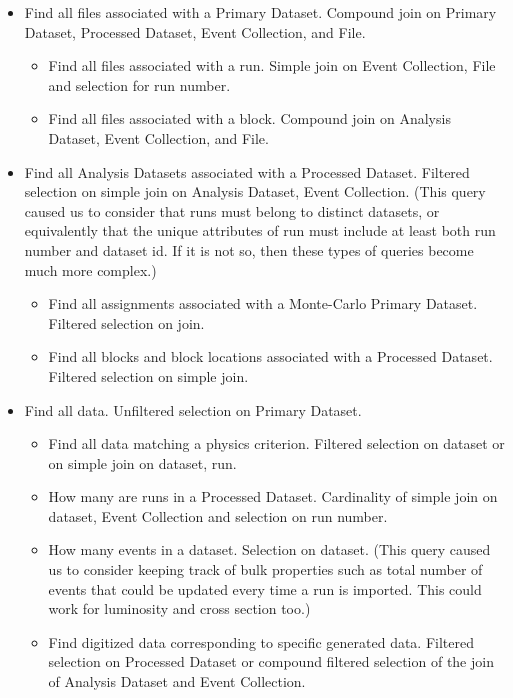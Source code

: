 \documentclass{cmspaper}
\begin{document}
\begin{itemize}
\item Find all files associated with a Primary Dataset.  Compound join on Primary
Dataset, Processed Dataset, Event Collection, and File.
  \begin{itemize}
  \item Find all files associated with a run.  Simple join on Event Collection, File and selection for run number.
  \item Find all files associated with a block.  Compound join on Analysis Dataset, Event Collection, 
and File.
  \end{itemize}
\item Find all Analysis Datasets associated with a Processed Dataset.  Filtered selection on 
simple join on Analysis Dataset, Event Collection. (This query caused us to consider that runs 
must belong to distinct datasets, or equivalently that the unique attributes of 
run must include at least both run number and dataset id.  If it is not so, then 
these types of queries become much more complex.)
  \begin{itemize}
  \item Find all assignments associated with a Monte-Carlo Primary Dataset. Filtered selection on join.
  \item Find all blocks and block locations associated with a Processed Dataset. Filtered selection 
  on simple join.
  \end{itemize}
\item Find all data. Unfiltered selection on Primary Dataset.
  \begin{itemize}
  \item Find all data matching a physics criterion.  Filtered selection on dataset or 
  on simple join on dataset, run.
  \item How many are runs in a Processed Dataset.  
Cardinality of simple join on dataset, Event Collection and selection on run number.
  \item How many events in a dataset.  Selection on dataset.  (This query caused us to 
  consider keeping track of bulk properties such as total number of events that could be 
  updated every time a run is imported.  This could work for luminosity and cross section too.)
  \item Find digitized data corresponding to specific generated data. 
  Filtered selection on Processed Dataset or compound filtered selection of the join of 
Analysis Dataset and Event Collection.  
  \end{itemize}
\end{itemize}
\end{document}
